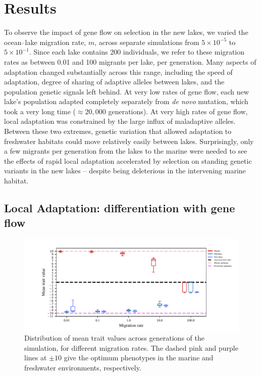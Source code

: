 \documentclass{article}
\begin{document}
\section*{Results}

To observe the impact of gene flow on selection in the new lakes, we varied the ocean--lake migration rate, $m$, across separate simulations from $5 \times 10^{-5}$ to $5 \times 10^{-1}$.
Since each lake contains 200 individuals, we refer to these migration rates as between 0.01 and 100 migrants per lake, per generation.
Many aspects of adaptation changed substantially across this range, including the speed of adaptation, degree of sharing of adaptive alleles between lakes, and the population genetic signals left behind.
At very low rates of gene flow, each new lake's population adapted completely separately from \emph{de novo} mutation, which took a very long time ($\approx 20,000$ generations).
At very high rates of gene flow, local adaptation was constrained by the large influx of maladaptive alleles.
Between these two extremes, genetic variation that allowed adaptation to freshwater habitats could move relatively easily between lakes.
Surprisingly, only a few migrants per generation from the lakes to the marine were needed
to see the effects of rapid local adaptation accelerated by selection on standing genetic variants in the new lakes -- despite being deleterious in the intervening marine habitat.

\subsection*{Local Adaptation: differentiation with gene flow}

\begin{figure}
	\begin{center}
  		\includegraphics{Final_Plots/Pheno_Dist.pdf}
  		\caption{
            Distribution of mean trait values across generations of the simulation,
            for different migration rates.
            The dashed pink and purple lines at $\pm 10$ give the optimum phenotypes
            in the marine and freshwater environments, respectively.
		}
  		\label{fig:MeanPhenotype}
	\end{center}
\end{figure}
\end{document}
